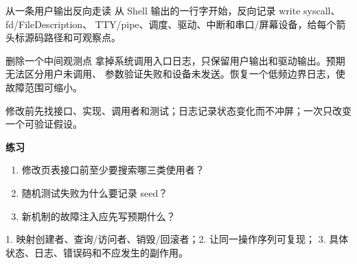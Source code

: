 
\begin{experimentbox}{从一条用户输出反向走读}
从 Shell 输出的一行字开始，反向记录 write syscall、fd/FileDescription、
TTY/pipe、调度、驱动、中断和串口/屏幕设备，给每个箭头标源码路径和可观察点。
\end{experimentbox}

\begin{faultinjectionbox}{删除一个中间观测点}
拿掉系统调用入口日志，只保留用户输出和驱动输出。预期无法区分用户未调用、
参数验证失败和设备未发送。恢复一个低频边界日志，使故障范围可缩小。
\end{faultinjectionbox}

\begin{pitfallbox}
修改前先找接口、实现、调用者和测试；日志记录状态变化而不冲屏；一次只改变
一个可验证假设。
\end{pitfallbox}

\textbf{练习}
\begin{enumerate}[leftmargin=2.2em]
  \item 修改页表接口前至少要搜索哪三类使用者？
  \item 随机测试失败为什么要记录 seed？
  \item 新机制的故障注入应先写预期什么？
\end{enumerate}
\begin{answerbox}
1. 映射创建者、查询/访问者、销毁/回滚者；2. 让同一操作序列可复现；
3. 具体状态、日志、错误码和不应发生的副作用。
\end{answerbox}

